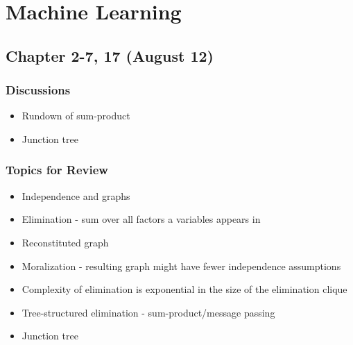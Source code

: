 \section{Machine Learning}

\subsection{Chapter 2-7, 17 (August 12)}

\subsubsection*{Discussions}
\begin{itemize}
\item Rundown of sum-product
\item Junction tree
\end{itemize}

\subsubsection*{Topics for Review}
\begin{itemize}
\item Independence and graphs
\item Elimination - sum over all factors a variables appears in
\item Reconstituted graph
\item Moralization - resulting graph might have fewer independence assumptions
\item Complexity of elimination is exponential in the size of the elimination clique
\item Tree-structured elimination - sum-product/message passing
\item Junction tree
\end{itemize}
